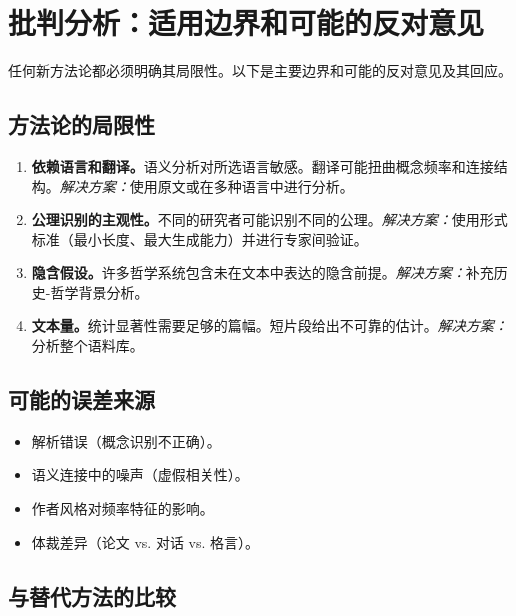\documentclass[11pt,a4paper]{article}
\begin{document}
	
	\section{批判分析：适用边界和可能的反对意见}
	\label{sec:critical-analysis}
	
	任何新方法论都必须明确其局限性。以下是主要边界和可能的反对意见及其回应。
	
	\subsection{方法论的局限性}
	
	\begin{enumerate}
		\item \textbf{依赖语言和翻译。}语义分析对所选语言敏感。翻译可能扭曲概念频率和连接结构。\textit{解决方案：}使用原文或在多种语言中进行分析。
		\item \textbf{公理识别的主观性。}不同的研究者可能识别不同的公理。\textit{解决方案：}使用形式标准（最小长度、最大生成能力）并进行专家间验证。
		\item \textbf{隐含假设。}许多哲学系统包含未在文本中表达的隐含前提。\textit{解决方案：}补充历史-哲学背景分析。
		\item \textbf{文本量。}统计显著性需要足够的篇幅。短片段给出不可靠的估计。\textit{解决方案：}分析整个语料库。
	\end{enumerate}
	
	\subsection{可能的误差来源}
	
	\begin{itemize}
		\item 解析错误（概念识别不正确）。
		\item 语义连接中的噪声（虚假相关性）。
		\item 作者风格对频率特征的影响。
		\item 体裁差异（论文 vs. 对话 vs. 格言）。
	\end{itemize}
	
	\subsection{与替代方法的比较}
	
\end{document}
